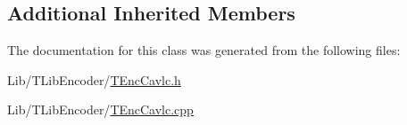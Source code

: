 \subsection*{Additional Inherited Members}


The documentation for this class was generated from the following files\+:\begin{DoxyCompactItemize}
\item 
Lib/\+T\+Lib\+Encoder/\hyperlink{_t_enc_cavlc_8h}{T\+Enc\+Cavlc.\+h}\item 
Lib/\+T\+Lib\+Encoder/\hyperlink{_t_enc_cavlc_8cpp}{T\+Enc\+Cavlc.\+cpp}\end{DoxyCompactItemize}
